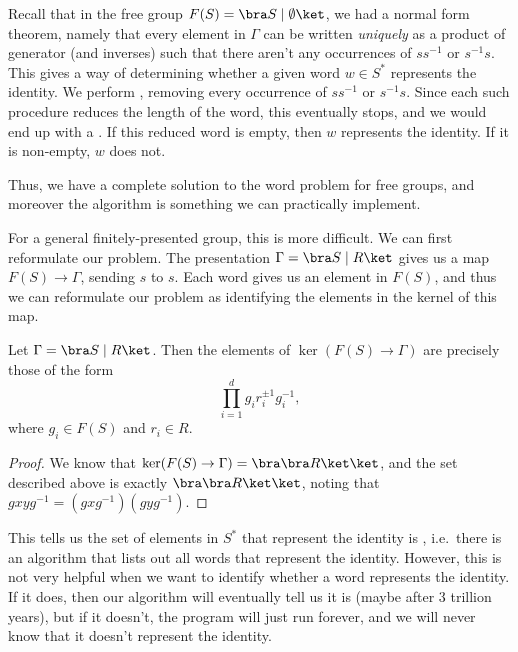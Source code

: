 \documentclass[a4paper]{article}
\begin{document}
\begin{eg}
  Recall that in the free group $F(S) = \bra S \mid \emptyset\ket$, we had a normal form theorem, namely that every element in $\Gamma$ can be written \emph{uniquely} as a product of generator (and inverses) such that there aren't any occurrences of $ss^{-1}$ or $s^{-1}s$. This gives a way of determining whether a given word $w \in S^*$ represents the identity. We perform , removing every occurrence of $ss^{-1}$ or $s^{-1}s$. Since each such procedure reduces the length of the word, this eventually stops, and we would end up with a . If this reduced word is empty, then $w$ represents the identity. If it is non-empty, $w$ does not.
\end{eg}
Thus, we have a complete solution to the word problem for free groups, and moreover the algorithm is something we can practically implement.

For a general finitely-presented group, this is more difficult. We can first reformulate our problem. The presentation $\Gamma = \bra S \mid R \ket$ gives us a map $F(S) \to \Gamma$, sending $s$ to $s$. Each word gives us an element in $F(S)$, and thus we can reformulate our problem as identifying the elements in the kernel of this map.

\begin{lemma}
  Let $\Gamma = \bra S \mid R\ket$. Then the elements of $\ker (F(S) \to \Gamma)$ are precisely those of the form
  \[
    \prod_{i = 1}^d g_i r_i^{\pm 1} g_i^{-1},
  \]
  where $g_i \in F(S)$ and $r_i \in R$.
\end{lemma}

\begin{proof}
  We know that $\ker (F(S) \to \Gamma) = \bra \bra R\ket \ket$, and the set described above is exactly $\bra \bra R\ket \ket$, noting that $gxyg^{-1} = (gxg^{-1})(gyg^{-1})$.
\end{proof}

This tells us the set of elements in $S^*$ that represent the identity is , i.e.\ there is an algorithm that lists out all words that represent the identity. However, this is not very helpful when we want to identify whether a word represents the identity. If it does, then our algorithm will eventually tell us it is (maybe after 3 trillion years), but if it doesn't, the program will just run forever, and we will never know that it doesn't represent the identity.
\end{document}
